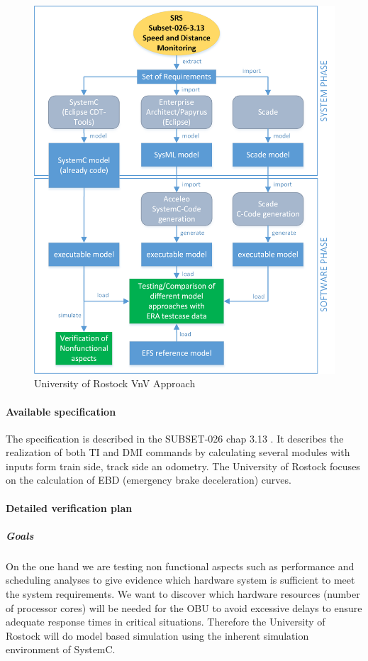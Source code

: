 \documentclass{article}
\begin{document}
\begin{figure}[h]
\centering
\includegraphics[width=.80\textwidth]{schema/UniRostockApproach.png}
\vspace{4mm}
\caption{University of Rostock VnV Approach}
\label{fig:University of Rostock VnV Approach} 
\end{figure}

\paragraph{Available specification}

The specification is described in the
SUBSET-026\cite{unisig_subset-026_2012} chap 3.13 \cite{chap3-13}. It describes the realization of both TI and DMI commands by calculating several modules with inputs form train side, track side an odometry. The University of Rostock focuses on the calculation of EBD (emergency brake deceleration) curves.

\paragraph{Detailed verification plan}

\subparagraph{Goals}

On the one hand we are testing non functional aspects such as performance and scheduling analyses to give evidence which hardware system is sufficient to meet the system requirements. We want to discover which  hardware resources (number of processor cores) will be needed for the OBU to avoid excessive delays to ensure adequate response times in critical situations. Therefore the University of Rostock will do model based simulation using the inherent simulation environment of SystemC.
\end{document}
